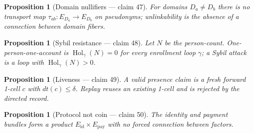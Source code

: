 \documentclass[11pt,a4paper]{article}
\newtheorem{proposition}[definition]{Proposition}
\begin{document}
\begin{proposition}[Domain nullifiers --- claim 47]
For domains $D_a\neq D_b$ there is no transport map
$\tau_{ab}:E_{D_a}\to E_{D_b}$ on pseudonyms; unlinkability is the absence of
a connection between domain fibers.
\end{proposition}

\begin{proposition}[Sybil resistance --- claim 48]
Let $N$ be the person-count. One-person-one-account is
$\operatorname{Hol}_\gamma(N)=0$ for every enrollment loop $\gamma$;
a Sybil attack is a loop with $\operatorname{Hol}_\gamma(N)>0$.
\end{proposition}

\begin{proposition}[Liveness --- claim 49]
A valid presence claim is a fresh forward 1-cell $c$ with $dt(c)\le\delta$.
Replay reuses an existing 1-cell and is rejected by the directed record.
\end{proposition}

\begin{proposition}[Protocol not coin --- claim 50]
The identity and payment bundles form a product $E_{\mathrm{id}}\times E_{\mathrm{pay}}$
with no forced connection between factors.
\end{proposition}
\end{document}
